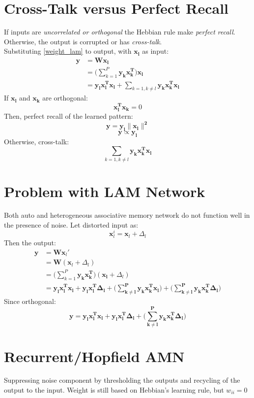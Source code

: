\section{Cross-Talk versus Perfect Recall}
If inputs are \emph{uncorrelated or orthogonal} the Hebbian rule make \emph{perfect recall}. Otherwise, the output is corrupted or has \emph{cross-talk}. \\
Substituting \ref{weight_lam} to output, with $\mathbf{x_l}$ as input:
\begin{equation}
\begin{split}
\mathbf{y} &= \mathbf{Wx_l} \\
&= \Big(\sum_{k=1}^{P} \mathbf{y_k x_k^{T}} \Big) \mathbf{x_l} \\
&= \mathbf{y_l x_l^{T} x_l} + \sum_{k=1,k \ne l} \mathbf{y_k x_k^{T} x_l}
\end{split}
\end{equation}
If $\mathbf{x_l}$ and $\mathbf{x_k}$ are orthogonal:
$$\mathbf{x_l^{T} x_k} = 0$$
Then, perfect recall of the learned pattern:
$$\mathbf{y = y_l \| x_l \|^{2}}$$
$$\mathbf{y \propto y_l}$$
Otherwise, cross-talk:
$$\sum_{k=1,k \ne l} \mathbf{y_k x_k^{T} x_l}$$

\section{Problem with LAM Network}
Both auto and heterogeneous associative memory network do not function well in the presence of noise. 
Let distorted input as:
$$\mathbf{x}_l^{i} = \mathbf{x}_l + \Delta_l$$
Then the output:
\begin{equation*}
\begin{split}
\mathbf{y} &= \mathbf{W} \mathbf{x}_l' \\
&= \mathbf{W} (\mathbf{x}_l + \Delta_l) \\
&= \Big(\sum_{k=1}^{P} \mathbf{y_k x_k^{T}}\Big) (\mathbf{x_l} + \Delta_l) \\
&= \mathbf{y_l x_l^{T} x_l + y_l x_l^{T} \Delta_l + \Big(\sum_{k \ne l}^{P} \mathbf{y_k x_k^{T} x_l}\Big) + \Big(\sum_{k \ne l}^{P} \mathbf{y_k x_k^{T} \Delta_l}\Big)}
\end{split}
\end{equation*}
Since orthogonal: 
$$\mathbf{y} = \mathbf{y_l x_l^{T} x_l + y_l x_l^{T} \Delta_l +  \Big(\sum_{k \ne l}^{P} \mathbf{y_k x_k^{T} \Delta_l}\Big)}$$

\section{Recurrent/Hopfield AMN}
Suppressing noise component by thresholding the outputs and recycling of the output to the input. Weight is still based on Hebbian's learning rule, but $w_{ii} = 0$

